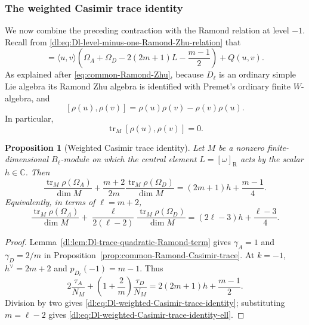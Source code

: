 \documentclass[11pt,reqno]{amsart}
\newtheorem{proposition}[theorem]{Proposition}
\theoremstyle{definition}
\theoremstyle{remark}
\begin{document}
\subsubsection{The weighted Casimir trace identity}


We now combine the preceding contraction with the Ramond relation at
level \(-1\).  Recall from
\eqref{dl:eq:Dl-level-minus-one-Ramond-Zhu-relation} that
\begin{equation*}
  [u,v]
  =
  \langle u,v\rangle
  \left(
    \Omega_A+\Omega_D
    -2(2m+1)L
    -\frac{m-1}{2}
  \right)
  +Q(u,v).
\end{equation*}
As explained after \eqref{eq:common-Ramond-Zhu}, because
$D_\ell$ is an ordinary simple Lie algebra its Ramond Zhu algebra is
identified with Premet's ordinary finite $W$-algebra, and
\[
  [\rho(u),\rho(v)]
  =
  \rho(u)\rho(v)-\rho(v)\rho(u).
\]
In particular,
\begin{equation*}
  \operatorname{tr}_M
  [\rho(u),\rho(v)]
  =0.
\end{equation*}

\begin{proposition}[Weighted Casimir trace identity]
\label{dl:prop:Dl-weighted-Casimir-trace-identity}
Let \(M\) be a nonzero finite-dimensional \(B_\ell\)-module on which
the central element \(L=[\omega]_{\mathrm R}\) acts by the scalar
\(h\in\mathbb C\).  Then
\begin{equation}
  \frac{\operatorname{tr}_M\rho(\Omega_A)}{\dim M}
  +
  \frac{m+2}{2m}
  \frac{\operatorname{tr}_M\rho(\Omega_D)}{\dim M}
  =
  (2m+1)h+\frac{m-1}{4}.
  \label{dl:eq:Dl-weighted-Casimir-trace-identity}
\end{equation}
Equivalently, in terms of \(\ell=m+2\),
\begin{equation}
  \frac{\operatorname{tr}_M\rho(\Omega_A)}{\dim M}
  +
  \frac{\ell}{2(\ell-2)}
  \frac{\operatorname{tr}_M\rho(\Omega_D)}{\dim M}
  =
  (2\ell-3)h+\frac{\ell-3}{4}.
  \label{dl:eq:Dl-weighted-Casimir-trace-identity-ell}
\end{equation}
\end{proposition}

\begin{proof}
Lemma~\ref{dl:lem:Dl-trace-quadratic-Ramond-term} gives
$\gamma_A=1$ and $\gamma_D=2/m$ in
Proposition~\ref{prop:common-Ramond-Casimir-trace}.  At $k=-1$,
$h^\vee=2m+2$ and $p_{D_\ell}(-1)=m-1$.  Thus
\[
 2\frac{\tau_A}{N_M}+\left(1+\frac2m\right)\frac{\tau_D}{N_M}
 =2(2m+1)h+\frac{m-1}{2}.
\]
Division by two gives \eqref{dl:eq:Dl-weighted-Casimir-trace-identity};
substituting $m=\ell-2$ gives
\eqref{dl:eq:Dl-weighted-Casimir-trace-identity-ell}.
\end{proof}
\end{document}
